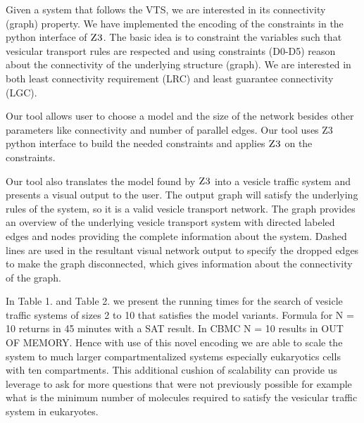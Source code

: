 Given a system that follows the VTS, we are interested in its connectivity (graph) property. We have implemented the encoding of the constraints in the python interface of $\textsc{Z3}$. The basic idea is to constraint the variables such that vesicular transport rules are respected and using constraints (D0-D5) reason about the connectivity of the underlying structure (graph). We are interested in both least connectivity requirement (LRC) and least guarantee connectivity (LGC).


%
Our tool allows user to choose a model and the size of the network besides other parameters like connectivity and number of parallel edges. Our tool uses Z3 python interface to build the needed constraints and applies $\textsc{Z3}$ on the constraints.

Our tool also translates the model found by $\textsc{Z3}$ into a vesicle traffic system and presents a visual
output to the user. The output graph will satisfy the underlying rules of the system, so it is a valid vesicle transport network. The graph provides an overview of the underlying vesicle transport system with directed labeled edges and nodes providing the complete information about the system. Dashed lines are used in the resultant visual network output to specify the dropped edges to make the graph disconnected, which gives information about the connectivity of the graph.



In Table 1. and Table 2.
we present the running times for the search of vesicle traffic systems of sizes 2 to 10 that satisfies the model variants. Formula for N = 10 returns in 45 minutes with a SAT result. In CBMC N = 10 results in OUT OF MEMORY. Hence with use of this novel encoding we are able to scale the system to much larger compartmentalized systems especially eukaryotics cells with ten compartments.  This additional cushion of scalability can provide us leverage to ask for more questions that were not previously possible for example what is the minimum number of molecules required to satisfy the vesicular traffic system in eukaryotes.

